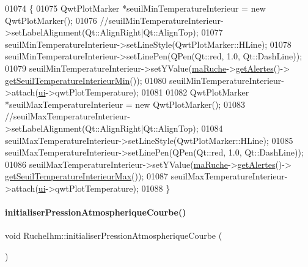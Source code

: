 \begin{DoxyCode}
01074 \{
01075     QwtPlotMarker *seuilMinTemperatureInterieur = \textcolor{keyword}{new} QwtPlotMarker();
01076     \textcolor{comment}{//seuilMinTemperatureInterieur->setLabelAlignment(Qt::AlignRight|Qt::AlignTop);}
01077     seuilMinTemperatureInterieur->setLineStyle(QwtPlotMarker::HLine);
01078     seuilMinTemperatureInterieur->setLinePen(QPen(Qt::red, 1.0, Qt::DashLine));
01079     seuilMinTemperatureInterieur->setYValue(\hyperlink{class_ruche_ihm_a43a6b1fa31f4fba58d919daae3707b38}{maRuche}->\hyperlink{class_ruche_a9edbc2e81ccb2cb76de43639bcb16ec1}{getAlertes}()->
      \hyperlink{class_alertes_af61b11556d97f923cf7dd25ac4f5dd05}{getSeuilTemperatureInterieurMin}());
01080     seuilMinTemperatureInterieur->attach(\hyperlink{class_ruche_ihm_a64786058bd7f88ca2f1e9743bb27c25b}{ui}->qwtPlotTemperature);
01081 
01082     QwtPlotMarker *seuilMaxTemperatureInterieur = \textcolor{keyword}{new} QwtPlotMarker();
01083     \textcolor{comment}{//seuilMaxTemperatureInterieur->setLabelAlignment(Qt::AlignRight|Qt::AlignTop);}
01084     seuilMaxTemperatureInterieur->setLineStyle(QwtPlotMarker::HLine);
01085     seuilMaxTemperatureInterieur->setLinePen(QPen(Qt::red, 1.0, Qt::DashLine));
01086     seuilMaxTemperatureInterieur->setYValue(\hyperlink{class_ruche_ihm_a43a6b1fa31f4fba58d919daae3707b38}{maRuche}->\hyperlink{class_ruche_a9edbc2e81ccb2cb76de43639bcb16ec1}{getAlertes}()->
      \hyperlink{class_alertes_ac514ebef5e7e65aa7bee0ebe3cd7e883}{getSeuilTemperatureInterieurMax}());
01087     seuilMaxTemperatureInterieur->attach(\hyperlink{class_ruche_ihm_a64786058bd7f88ca2f1e9743bb27c25b}{ui}->qwtPlotTemperature);
01088 \}
\end{DoxyCode}
\mbox{\label{class_ruche_ihm_ab070a28e49cab512d62ca449473706e5}} 
\paragraph{\texorpdfstring{initialiser\+Pression\+Atmospherique\+Courbe()}{initialiserPressionAtmospheriqueCourbe()}}
{\footnotesize\ttfamily void Ruche\+Ihm\+::initialiser\+Pression\+Atmospherique\+Courbe (\begin{DoxyParamCaption}{ }\end{DoxyParamCaption})\hspace{0.3cm}{\ttfamily [private]}}




